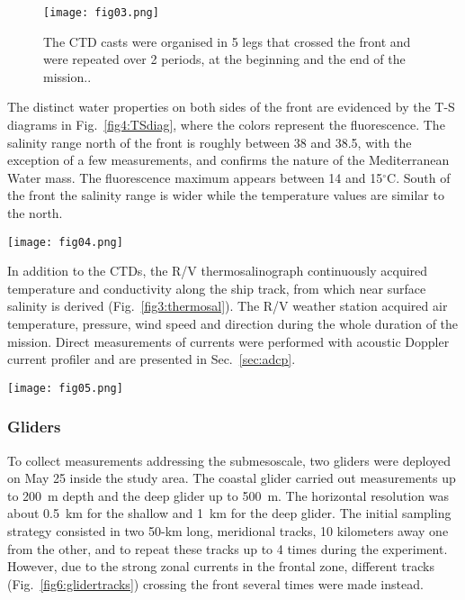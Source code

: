 \documentclass[essd]{copernicus}
\begin{document}
\begin{figure}[t]
\texttt{[image: fig03.png]}
\caption{The CTD casts were organised in 5 legs that crossed the front and were repeated over 2 periods, at the beginning and the end of the mission.\label{fig3:CTD}.}
\end{figure}

The distinct water properties on both sides of the front are evidenced by the T-S diagrams in Fig.~\ref{fig4:TSdiag}, where the colors represent the fluorescence. The salinity range north of the front is roughly between 38 and 38.5, with the exception of a few measurements, and confirms the nature of the Mediterranean Water mass. The fluorescence maximum appears between 14 and 15$^{\circ}$C. South of the front the salinity range is wider 	while the temperature values are similar to the north.

\begin{figure*}[t]
\texttt{[image: fig04.png]}
\caption{The T-S diagrams are shown separately for the casts located north and south of the front (broad, dashed line) \label{fig4:TSdiag}.}
\end{figure*}

In addition to the CTDs, the R/V thermosalinograph continuously acquired temperature and conductivity along the ship track, from which near surface salinity is derived (Fig.~\ref{fig3:thermosal}). The R/V weather station acquired air temperature, pressure, wind speed and direction during the whole duration of the mission. Direct measurements of currents were performed with acoustic Doppler current profiler and are presented in Sec.~\ref{sec:adcp}. 

\begin{figure*}[t]
\texttt{[image: fig05.png]}
\caption{The near-surface salinity (colored dots) measured by the thermosalinograph evidences the strong horizontal gradients, in agreement with the front position as obtained using the SST (broad, dashed line). The 5 subplots depict the temperature and salinity along select meridional tracks. \label{fig3:thermosal}}
\end{figure*}

\subsubsection{Gliders}

To collect measurements addressing the submesoscale, two gliders were deployed on May 25 inside the study area. The coastal glider carried out measurements up to 200~m depth and the deep glider up to 500~m. The horizontal resolution was about 0.5~km for the shallow and 1~km for the deep glider. The initial sampling strategy consisted in two 50-km long, meridional tracks, 10 kilometers away one from the other, and to repeat these tracks up to 4 times during the experiment. However, due to the strong zonal currents in the frontal zone, different tracks (Fig.~\ref{fig6:glidertracks}) crossing the front several times were made instead.
\end{document}
